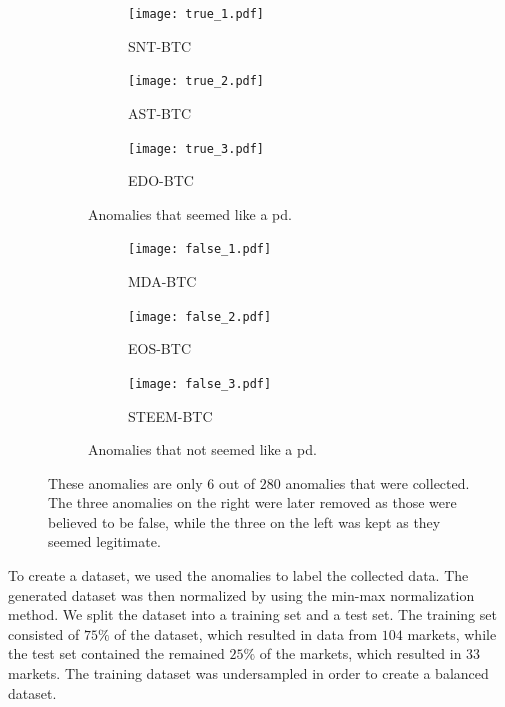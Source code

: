 \begin{figure}[hbt!]
    \centering
    \begin{subfigure}{.49\textwidth}
        \centering
        \begin{subfigure}{\textwidth}
            \texttt{[image: true\_1.pdf]}
            \caption*{SNT-BTC}
        \end{subfigure}
        \begin{subfigure}{\textwidth}
            \texttt{[image: true\_2.pdf]}
            \caption*{AST-BTC}
        \end{subfigure}
        \begin{subfigure}{\textwidth}
            \texttt{[image: true\_3.pdf]}
            \caption*{EDO-BTC}
        \end{subfigure}
        \caption{Anomalies that seemed like a \ac{pd}.}
        \label{fig:label_true}
    \end{subfigure}
    \hfill
    \begin{subfigure}{.49\textwidth}
        \centering
        \begin{subfigure}{\textwidth}
            \texttt{[image: false\_1.pdf]}
            \caption*{MDA-BTC}
        \end{subfigure}
        \begin{subfigure}{\textwidth}
            \texttt{[image: false\_2.pdf]}
            \caption*{EOS-BTC}
        \end{subfigure}
        \begin{subfigure}{\textwidth}
            \texttt{[image: false\_3.pdf]}
            \caption*{STEEM-BTC}
        \end{subfigure}
        \caption{Anomalies that not seemed like a \ac{pd}.}
        \label{fig:label_false}    
    \end{subfigure}
    \caption[Anomalies in the dataset]{These anomalies are only $6$ out of $280$ anomalies that were collected. The three anomalies on the right were later removed as those were believed to be false, while the three on the left was kept as they seemed legitimate.}
\end{figure}

To create a dataset, we used the anomalies to label the collected data. The generated dataset was then normalized by using the min-max normalization method. We split the dataset into a training set and a test set. The training set consisted of $75\%$ of the dataset, which resulted in data from $104$ markets, while the test set contained the remained $25\%$ of the markets, which resulted in $33$ markets. The training dataset was undersampled in order to create a balanced dataset.

